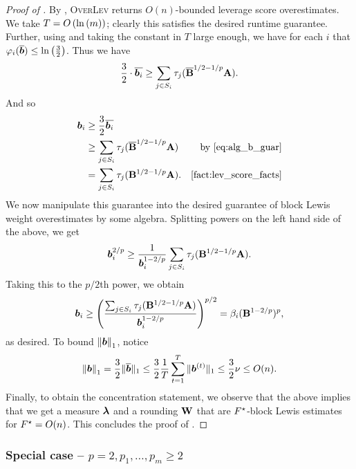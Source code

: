 \documentclass[11pt]{article}
\numberwithin{equation}{section}
\begin{document}
\begin{proof}[Proof of ]
By , \textsc{OverLev} returns \(O(n)\)-bounded leverage score overestimates.
We take \(T = O\left(\ln\left(m\right)\right)\); clearly this satisfies the desired runtime guarantee. Further, using  and taking the constant in \(T\) large enough, we have for each \(i\) that \(\varphi_i(\overline{\bm{b}}) \le \ln\left(\frac{3}{2}\right)\).
Thus we have
\begin{equation}\label{eq:alg_b_guar}
    \frac{3}{2} \cdot \overline{\bm{b}_i} \ge \sum_{j \in S_i} \tau_j(\overline{\mathbf{B}}^{1/2 - 1/p} \mathbf{A}).
\end{equation}
And so
\begin{align*}
    \vb_i &\ge \frac{3}{2} \overline{\vb_i} \\
    &\ge \sum_{j \in S_i} \tau_j(\overline{\mB}^{1/2 - 1/p} \mA) &\text{by \eqref{eq:alg_b_guar}} \\
    &= \sum_{j \in S_i} \tau_j(\mB^{1/2 - 1/p} \mA). &\text{\Cref{fact:lev_score_facts}}
\end{align*}
We now manipulate this guarantee into the desired guarantee of block Lewis weight overestimates
by some algebra.
Splitting powers on the left hand side of the above, we get
\[
\bm{b}_i^{2/p} \ge \frac{1}{\bm{b}_i^{1-2/p}} \sum_{j \in S_i} \tau_j(\mathbf{B}^{1/2 - 1/p} \mathbf{A}).
\]
Taking this to the \(p/2\)th power, we obtain
\begin{align*}
    \bm{b}_i \ge \left(\frac{\sum_{j \in S_i} \tau_j(\mathbf{B}^{1/2-1/p} \mathbf{A})}{\bm{b}_i^{1-2/p}}\right)^{p/2} = \beta_i(\mathbf{B}^{1-2/p})^p,
\end{align*}
as desired. To bound \(\left\lVert \bm{b} \right\rVert_1\), notice
\begin{align*}
    \left\lVert \bm{b} \right\rVert_1 = \frac{3}{2} \|\overline{\bm{b}}\|_1 \le \frac{3}{2} \frac{1}{T} \sum_{t=1}^T \|\bm{b}^{(t)}\|_1 \le \frac{3}{2} \nu \le O(n).
\end{align*}
Finally, to obtain the concentration statement, we observe that the above implies that we get a measure $\bm{\lambda}$ and a rounding $\mathbf{W}$ that are $F^{\star}$-block Lewis estimates for $F^{\star}=O(n)$. This concludes the proof of .
\end{proof}

\subsubsection{Special case -- \texorpdfstring{$p = 2, p_1,\dots,p_m\ge2$}{p=2,p1,...,pm>=2}}
\end{document}
